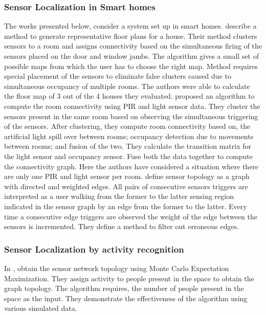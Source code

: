 \subsubsection*{Sensor Localization in Smart homes}
The works presented below, consider a system set up in smart homes. 
\citeauthor{Lu:2014:SBS:2648771.2629441} \cite{Lu:2014:SBS:2648771.2629441} describe a method to generate representative floor plans for a house. Their method clusters sensors to a room and assigns connectivity based on the simultaneous firing of the sensors placed on the door and window jambs. The algorithm gives a small set of possible maps from which the user has to choose the right map. Method requires special placement of the sensors to eliminate false clusters caused due to simultaneous occupancy of multiple rooms. The authors were able to calculate the floor map of 3 out of the 4 houses they evaluated.  
 \citeauthor{ellis2012creating} \cite{ellis2012creating} proposed an algorithm to compute the room connectivity using  PIR and light sensor data. They cluster the sensors present in the same room based  on observing the simultaneous triggering of the sensors. After clustering, they compute room connectivity based on, the artificial light spill over between rooms; occupancy detection due to movements between
  rooms; and fusion of the two. They calculate the transition matrix for the light sensor and occupancy sensor. Fuse both the data together to compute the connectivity graph. Here the authors have considered a situation where there are only one PIR and light sensor per room.
\citeauthor{muller2014automated} \cite{muller2014automated} define  sensor topology as a graph with directed and weighted edges. All pairs of consecutive sensors triggers are interpreted as a user walking from the former to the latter sensing region indicated in the sensor 
graph by an edge from the former to the latter. Every time a consecutive edge triggers are observed the weight of the edge between the sensors is incremented. They define a method to filter out erroneous edges.
\subsubsection*{Sensor Localization by activity recognition}
In \cite{marinakis2005learning}, \citeauthor{marinakis2005learning} obtain the sensor network topology using Monte Carlo Expectation Maximization. They assign activity to people present in the space to obtain the graph topology. The algorithm requires, the number of people present in the space as the input. They demonstrate the effectiveness of the algorithm using various simulated data.
